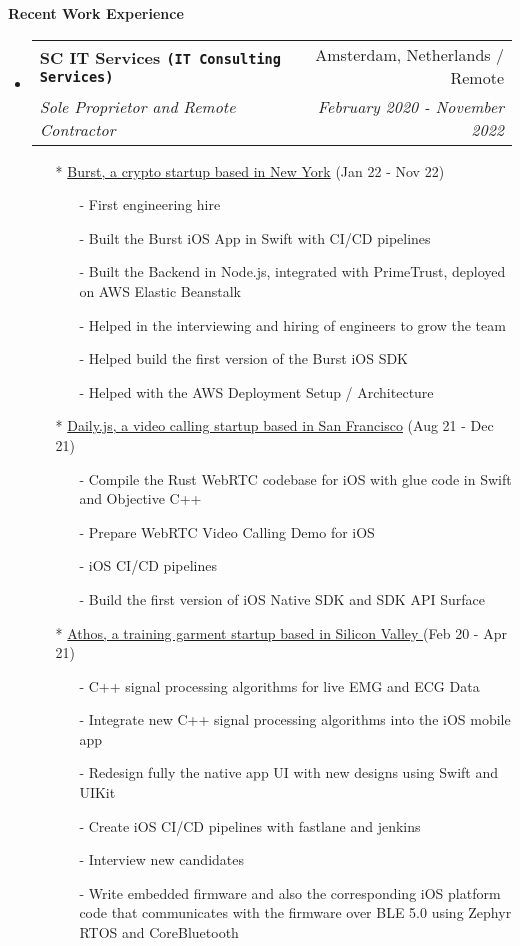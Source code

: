 \documentclass[letterpaper,11pt]{article}
\makeatletter
\newcommand{\resheading}[1]{{\large \colorbox{mygrey}{\begin{minipage}{\textwidth}{\textbf{#1 \vphantom{p\^{E}}}}\end{minipage}}}}
\newcommand{\ressubheading}[4]{
\begin{tabular*}{7.0in}{l@{\extracolsep{\fill}}r}
    \textbf{#1} & #2 \\
    \textit{#3} & \textit{#4} \\
\end{tabular*}\vspace{-6pt}}
\makeatother
\begin{document}
\resheading{Recent Work Experience}
\begin{itemize}

\item
    \ressubheading{{SC IT Services \texttt{(IT Consulting Services)}}}{Amsterdam, Netherlands / Remote}{Sole Proprietor and Remote Contractor}{February 2020 - November 2022}
    \begin{itemize}    
        \item[*] \href{https://www.joinburst.com}{Burst, a crypto startup based in New York} (Jan 22 - Nov 22)
        \begin{itemize}   
        \item[-]{First engineering hire}
        \item[-]{Built the Burst iOS App in Swift with CI/CD pipelines}
        \item[-]{Built the Backend in Node.js, integrated with PrimeTrust, deployed on AWS Elastic Beanstalk}
        \item[-]{Helped in the interviewing and hiring of engineers to grow the team}
        \item[-]{Helped build the first version of the Burst iOS SDK}
        \item[-]{Helped with the AWS Deployment Setup / Architecture}
        \end{itemize}
        \item[*] \href{https://daily.co}{Daily.js, a video calling startup based in San Francisco} 
        (Aug 21 - Dec 21)
        \begin{itemize}    
        \item[-]{Compile the Rust WebRTC codebase for iOS with glue code in Swift and Objective C++}
        \item[-]{Prepare WebRTC Video Calling Demo for iOS}
        \item[-]{iOS CI/CD pipelines}
        \item[-]{Build the first version of iOS Native SDK and SDK API Surface}
        \end{itemize}
        \item[*] \href{https://www.crunchbase.com/organization/athos}{Athos, a training garment startup based in Silicon Valley }(Feb 20 - Apr 21)
        \begin{itemize}
        \item[-]{C++ signal processing algorithms for live EMG and ECG Data}
        \item[-]{Integrate new C++ signal processing algorithms into the iOS mobile app}
        \item[-]{Redesign fully the native app UI with new designs using Swift and UIKit}
        \item[-]{Create iOS CI/CD pipelines with fastlane and jenkins}
        \item[-]{Interview new candidates}
        \item[-]{Write embedded firmware and also the corresponding iOS platform code that communicates with the firmware over BLE 5.0 using Zephyr RTOS and CoreBluetooth}
        \end{itemize}
    \end{itemize}


\end{itemize}
\end{document}
